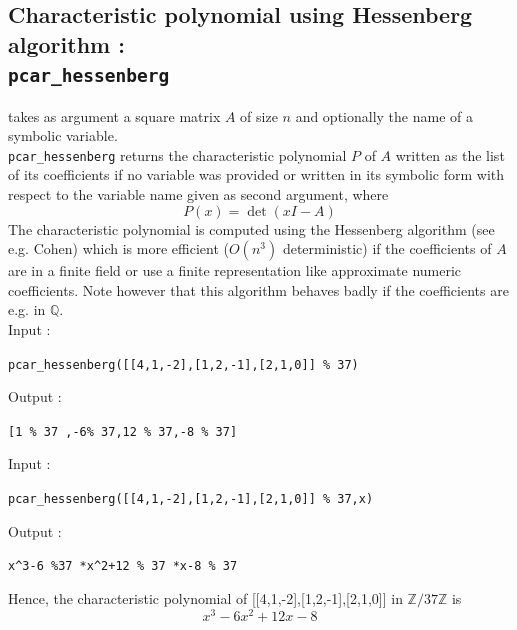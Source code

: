\documentclass[a4paper,11pt]{book}
\begin{document}
\subsection{Characteristic polynomial using Hessenberg algorithm :\\
 {\tt pcar\_hessenberg}}
 takes as argument a square 
matrix $A$ of size $n$ and optionally the name of a symbolic variable.\\
{\tt pcar\_hessenberg} returns the characteristic polynomial $P$ of $A$ written
as the list of its coefficients if no variable was provided
or written in its symbolic form with respect to the variable name given 
as second argument, where
\[ P(x)=\det(xI-A) \]
The characteristic polynomial is computed using the Hessenberg algorithm
(see e.g. Cohen) which is more efficient ($O(n^3)$ deterministic) if 
the coefficients of $A$ are in a finite field or use a finite 
representation like approximate numeric coefficients. Note however that
this algorithm behaves badly if the coefficients are e.g. in $\mathbb Q$.\\
Input :
\begin{center}{\tt pcar\_hessenberg([[4,1,-2],[1,2,-1],[2,1,0]] \% 37)}\end{center}
Output :
\begin{center}{\tt[1 \% 37 ,-6\% 37,12 \% 37,-8 \% 37]}\end{center}
Input :
\begin{center}{\tt pcar\_hessenberg([[4,1,-2],[1,2,-1],[2,1,0]] \% 37,x)}\end{center}
Output :
\begin{center}{\tt x\verb|^|3-6 \%37 *x\verb|^|2+12 \% 37 *x-8 \% 37}\end{center}
Hence, the characteristic polynomial of [[4,1,-2],[1,2,-1],[2,1,0]] in
$\mathbb Z/37 \mathbb Z$ is
\[ x^3-6x^2+12x-8 \]
\end{document}
